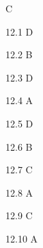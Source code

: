 \begin{Solution}{12}
C
\end{Solution}
\begin{Solution}{12.{1}}
D
\end{Solution}
\begin{Solution}{12.{2}}
B
\end{Solution}
\begin{Solution}{12.{3}}
D
\end{Solution}
\begin{Solution}{12.{4}}
A
\end{Solution}
\begin{Solution}{12.{5}}
D
\end{Solution}
\begin{Solution}{12.{6}}
B
\end{Solution}
\begin{Solution}{12.{7}}
C
\end{Solution}
\begin{Solution}{12.{8}}
A
\end{Solution}
\begin{Solution}{12.{9}}
C
\end{Solution}
\begin{Solution}{12.{10}}
A
\end{Solution}
